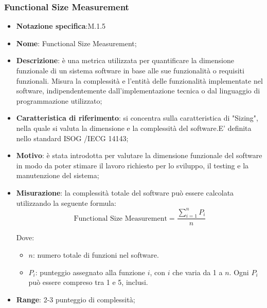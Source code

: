 \subsubsection{Functional Size Measurement}
\begin{itemize}
    \item \textbf{Notazione specifica}:M.1.5
    \item \textbf{Nome}: Functional Size Measurement;
    \item \textbf{Descrizione}: è una metrica utilizzata per quantificare la dimensione funzionale di un sistema software in base alle sue funzionalità o requisiti funzionali. Misura la complessità e l'entità delle funzionalità implementate nel software, indipendentemente dall'implementazione tecnica o dal linguaggio di programmazione utilizzato;
    \item \textbf{Caratteristica di riferimento}: si concentra sulla caratteristica di "Sizing", nella quale si valuta la dimensione e la complessità del software.E’ definita nello standard  ISOG /IECG 14143;
    \item \textbf{Motivo}: è stata introdotta per valutare la dimensione funzionale del software in modo da poter stimare il lavoro richiesto per lo sviluppo, il testing e la manutenzione del sistema;
    \item \textbf{Misurazione}: la complessità totale del software può essere calcolata utilizzando la seguente formula:
    \[
    \text{Functional Size Measurement} = \frac{\sum_{i=1}^{n} P_i}{n}
    \]
    
    Dove:
    \begin{itemize}
        \item $n$: numero totale di funzioni nel software.
        \item $P_i$: punteggio assegnato alla funzione $i$, con $i$ che varia da 1 a $n$. Ogni $P_i$ può essere compreso tra 1 e 5, inclusi.
    \end{itemize}

    \item \textbf{Range}: 2-3 punteggio di complessità;
\end{itemize}